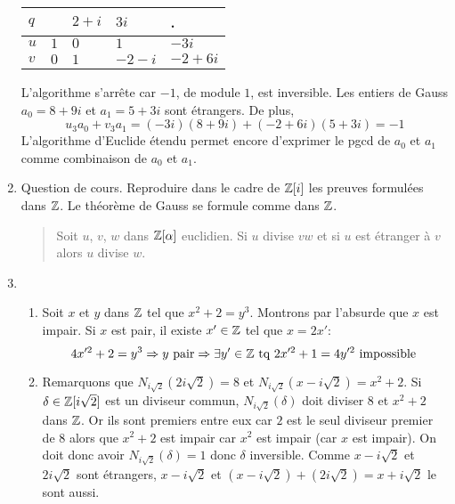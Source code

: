 \begin{enumerate}
\begin{center}
\begin{tabular}{|l|l|l|l|l|}
$q$ &        & $2+i$ & $3i$   & .      \\ \hline
$u$ & $1$    & $0$   & $1$    & $-3i$  \\ \hline
$v$ & $0$    & $1$   & $-2-i$ & $-2+6i$ \\ \hline
  \end{tabular}
  \end{center}
L'algorithme s'arrête car $-1$, de module $1$, est inversible.\newline
Les entiers de Gauss $a_0 = 8+9i$ et $a_1 = 5+3i$ sont étrangers. De plus,
\begin{displaymath}
  u_3 a_0 + v_3a_1 = (-3i)(8+9i) + (-2+6i)(5+3i) = -1
\end{displaymath}
L'algorithme d'Euclide étendu permet encore d'exprimer le pgcd de $a_0$ et $a_1$ comme combinaison de $a_0$ et $a_1$.

  \item Question de cours. Reproduire dans le cadre de $\mathbb{Z}[i]$ les preuves formulées dans $\mathbb{Z}$. Le théorème de Gauss se formule comme dans $\mathbb{Z}$.
  \begin{quote}
    Soit $u$, $v$, $w$ dans $\mathbb{Z}[\alpha]$ euclidien. Si $u$ divise $vw$ et si $u$ est étranger à $v$ alors $u$ divise $w$. 
  \end{quote}


  \item
  \begin{enumerate}
    \item Soit $x$ et $y$ dans $\mathbb{Z}$ tel que $x^2 + 2 = y^3$. Montrons par l'absurde que $x$ est impair. Si $x$ est pair, il existe $x'\in\mathbb{Z}$ tel que $x=2x'$:
\begin{displaymath}
4x'^2 + 2 =y^3 \Rightarrow y \text{ pair} \Rightarrow \exists y'\in \mathbb{Z}\text{ tq } 2x'^2 + 1 = 4 y'^2 \text{ impossible }  
\end{displaymath}

    \item Remarquons que $N_{i\sqrt{2}}(2i\sqrt{2})=8$ et $N_{i\sqrt{2}}(x-i\sqrt{2})=x^2+2$. Si $\delta \in \mathbb{Z}[i\sqrt{2}]$ est un diviseur commun, $N_{i\sqrt{2}}(\delta)$ doit diviser $8$ et $x^2+2$ dans $\mathbb{Z}$. Or ils sont premiers entre eux car $2$ est le seul diviseur premier de $8$ alors que $x^2+2$ est impair car $x^2$ est impair (car $x$ est impair). On doit donc avoir $N_{i\sqrt{2}}(\delta)=1$ donc $\delta$ inversible.\newline
     Comme $x-i\sqrt{2}$ et $2i\sqrt{2}$ sont étrangers, $x-i\sqrt{2}$ et $(x-i\sqrt{2}) + (2i\sqrt{2})=x+i\sqrt{2}$ le sont aussi.
    

\end{enumerate}
\end{enumerate}
